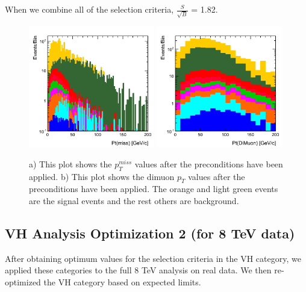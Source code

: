 \documentclass[12pt]{article}
\begin{document}
When we combine all of the selection criteria, $\frac{S}{\sqrt{B}} $ = 1.82.
\begin{figure}[!hbtp]
\begin{center}
    \includegraphics[width=0.49\textwidth]{images/Hist_PtMiss.png}
    \includegraphics[width=0.49\textwidth]{images/Hist_DiMuonPt.png}
    \caption{ \label{fig:ptmiss}
         a) This plot shows the $p^{miss}_{T}$ values after the preconditions have been applied. b) This plot shows the dimuon $p_{T}$ values 
	 after the preconditions have been applied. The orange and light green events are the signal events and the rest others are background.
      }
\end{center}
\end{figure} 


\subsection{VH Analysis Optimization 2 (for 8 TeV data)}

After obtaining optimum values for the selection criteria in the VH category, we applied these categories to the full 8 TeV analysis on real data. 
We then re-optimized the VH category based on expected limits. 
\end{document}

